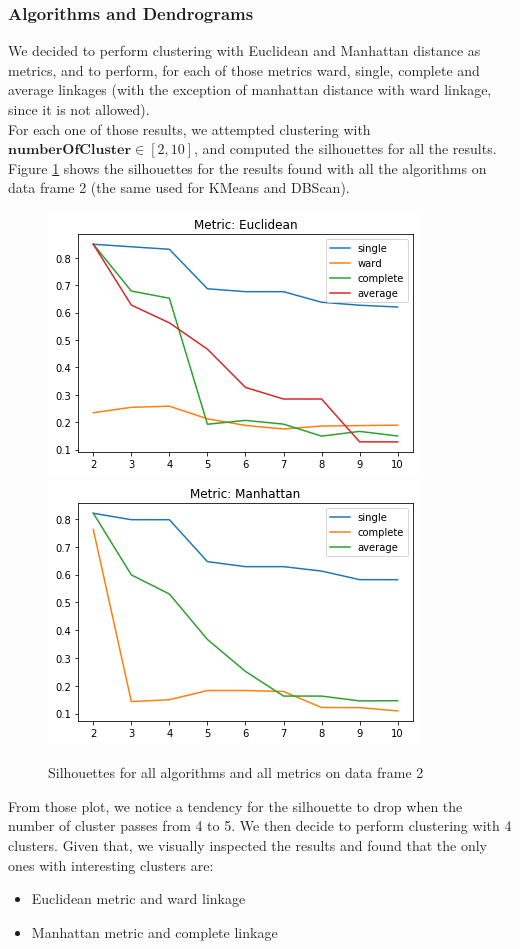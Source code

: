 \documentclass{article}
\begin{document}
	\subsubsection{Algorithms and Dendrograms}
	\label{sec:hier}
	We decided to perform clustering with Euclidean and Manhattan distance as metrics, and to perform, for each of those metrics ward, single, complete and average linkages (with the exception of manhattan distance with ward linkage, since it is not allowed).\\
	For each one of those results, we attempted clustering with $\mathbf{numberOfCluster} \in [2, 10]$, and computed the silhouettes for all the results.
	Figure \ref{fig:silu} shows the silhouettes for the results found with all the algorithms on data frame 2 (the same used for KMeans and DBScan).
	\begin{figure}[H]
		\centering
		\includegraphics[width=.49\textwidth]{silueuc}\hfill
		\includegraphics[width=.49\textwidth]{siluman.png}\hfill
		\caption{Silhouettes for all algorithms and all metrics on data frame 2}
		\label{fig:silu}
	\end{figure}
	From those plot, we notice a tendency for the silhouette to drop when the number of cluster passes from 4 to 5. We then decide to perform clustering with 4 clusters.
	Given that, we visually inspected the results and found that the only ones with interesting clusters are:
	\begin{itemize}
		\item Euclidean metric and ward linkage
		\item Manhattan metric and complete linkage
	\end{itemize}
\end{document}
